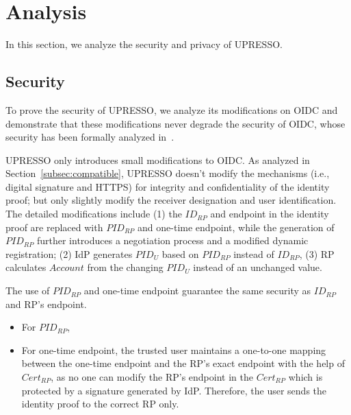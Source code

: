 \section{Analysis}
\label{sec:analysis}
In this section, we analyze the security and privacy of UPRESSO.

\subsection{Security}
\label{subsec:security}
To prove the security of UPRESSO, we analyze its modifications on OIDC and demonstrate that these modifications never degrade the security of OIDC,  
whose security  has been formally analyzed in~\cite{FettKS17}.

UPRESSO only introduces small modifications to OIDC.  
As analyzed in Section~\ref{subsec:compatible}, UPRESSO doesn't modify the mechanisms (i.e., digital signature and HTTPS) for integrity and confidentiality of the identity proof;
 but only slightly modify the receiver designation and user identification.
The detailed modifications include (1) the $ID_{RP}$ and endpoint in the identity proof are replaced with $PID_{RP}$ and one-time endpoint, while the generation of $PID_{RP}$ further introduces  a negotiation process and a modified dynamic registration;  
 (2) IdP generates $PID_U$ based on $PID_{RP}$ instead of $ID_{RP}$, (3) RP calculates $Account$ from the changing $PID_U$ instead of an unchanged value.
 
The use of $PID_{RP}$ and one-time endpoint guarantee the same security as $ID_{RP}$ and RP's endpoint.
\begin{itemize}
  \item For $PID_{RP}$,
  \item For one-time endpoint, the trusted user maintains a one-to-one mapping between the one-time endpoint and the RP's exact endpoint with the help of $Cert_{RP}$, as no one can modify the RP's endpoint in the $Cert_{RP}$ which is protected by a signature generated by IdP. Therefore, the user sends the identity proof to the correct RP only.
\end{itemize}

